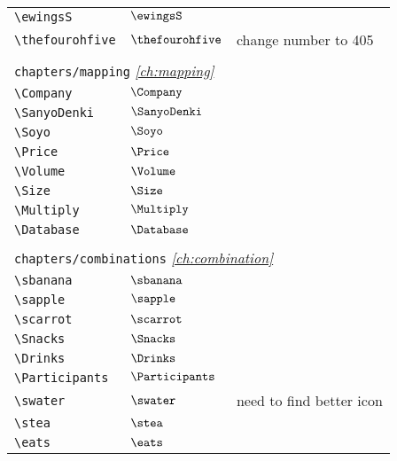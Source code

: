 \begin{longtable}{lll}
 {\color[rgb]{0.5,0.5,0.5}\texttt{\textbackslash ewingsS}} & $\ewingsS$ & \\ 
 {\color[rgb]{0.5,0.5,0.5}\texttt{\textbackslash thefourohfive}} & $\thefourohfive$ &  change number to 405\\ 
  &  & \\ 
 \multicolumn{3}{l}{{\color[rgb]{0.5,0.5,0.5}\texttt{chapters/mapping}} \emph{\cref{ch:mapping}}}\\ 
 \hline
{\color[rgb]{0.5,0.5,0.5}\texttt{\textbackslash Company}} & $\Company$ & \\ 
 {\color[rgb]{0.5,0.5,0.5}\texttt{\textbackslash SanyoDenki}} & $\SanyoDenki$ & \\ 
 {\color[rgb]{0.5,0.5,0.5}\texttt{\textbackslash Soyo}} & $\Soyo$ & \\ 
 {\color[rgb]{0.5,0.5,0.5}\texttt{\textbackslash Price}} & $\Price$ & \\ 
 {\color[rgb]{0.5,0.5,0.5}\texttt{\textbackslash Volume}} & $\Volume$ & \\ 
 {\color[rgb]{0.5,0.5,0.5}\texttt{\textbackslash Size}} & $\Size$ & \\ 
 {\color[rgb]{0.5,0.5,0.5}\texttt{\textbackslash Multiply}} & $\Multiply$ & \\ 
 {\color[rgb]{0.5,0.5,0.5}\texttt{\textbackslash Database}} & $\Database$ & \\ 
  &  & \\ 
 \multicolumn{3}{l}{{\color[rgb]{0.5,0.5,0.5}\texttt{chapters/combinations}} \emph{\cref{ch:combination}}}\\ 
 \hline
{\color[rgb]{0.5,0.5,0.5}\texttt{\textbackslash sbanana}} & $\sbanana$ & \\ 
 {\color[rgb]{0.5,0.5,0.5}\texttt{\textbackslash sapple}} & $\sapple$ & \\ 
 {\color[rgb]{0.5,0.5,0.5}\texttt{\textbackslash scarrot}} & $\scarrot$ & \\ 
 {\color[rgb]{0.5,0.5,0.5}\texttt{\textbackslash Snacks}} & $\Snacks$ & \\ 
 {\color[rgb]{0.5,0.5,0.5}\texttt{\textbackslash Drinks}} & $\Drinks$ & \\ 
 {\color[rgb]{0.5,0.5,0.5}\texttt{\textbackslash Participants}} & $\Participants$ & \\ 
 {\color[rgb]{0.5,0.5,0.5}\texttt{\textbackslash swater}} & $\swater$ &  need to find better icon\\ 
 {\color[rgb]{0.5,0.5,0.5}\texttt{\textbackslash stea}} & $\stea$ & \\ 
 {\color[rgb]{0.5,0.5,0.5}\texttt{\textbackslash eats}} & $\eats$ & \\ 

\end{longtable}
